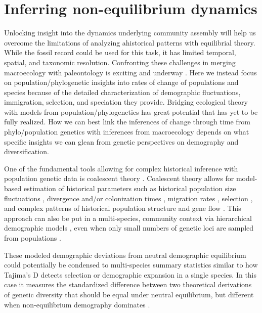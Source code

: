 \documentclass[12pt]{article}
\begin{document}
\section{Inferring non-equilibrium dynamics}

Unlocking insight into the dynamics underlying community assembly will
help us overcome the limitations of analyzing ahistorical patterns
with equilibrial theory. While the fossil record could be used for this task, it has limited temporal, spatial, and taxonomic resolution. Confronting these challenges in merging macroecology with paleontology is exciting and underway \citep{}. Here we instead focus on population/phylogenetic insights into rates of change of populations and species because of the detailed characterization of demographic fluctuations, immigration, selection, and speciation they provide. Bridging ecological theory with models from population/phylogenetics has great potential \citep{Webb2002-yr, Emerson2002-mw, Lavergne2010-ts, Li2016-ns, McGaughran2015-sy, Laroche2015-qo, Vanoverbeke2015-ym, Vellend2005-qd, Papadopoulou2011-bd,Dexter2012-rn} that has yet to be fully realized. How we can best link the inferences of change through time from
% 
% 
phylo/population genetics with inferences from macroecology depends on what specific insights we can glean from genetic perspectives on demography and diversification.

One of the fundamental tools allowing for complex historical inference
with population genetic data is coalescent theory
\citep{Hudson1983-hx, Tajima1983-me, Kingman1982-uf, Kingman1982-ie,
  Rosenberg2002-ag}.  Coalescent theory allows for model-based
estimation of historical parameters such as historical population size
fluctuations \citep{Kuhner1998-dp, Slatkin1991-ec}, divergence and/or
colonization times \citep{Charlesworth2010-hn, Edwards2000-cs},
migration rates \citep{Wakeley2008-se}, selection \citep{Kim2002-ex, Kern2016-ap, Ewing2016-bm}, and complex patterns of
historical population structure \citep{Prado-Martinez2013-hv,
  Bahlo2000-cx} and gene flow \citep{Beerli2001-mt,Hey2004-xe}. This
approach can also be put in a multi-species, community context via hierarchical demographic models \citep{Xue2015-el,
  Hickerson2006-uf, Carstens2016-mc, Chan2014-nq, Satler2016-lb}, even
when only small numbers of genetic loci are sampled from populations
\citep{Drummond2005-zh}.

These modeled demographic deviations from neutral demographic equilibrium could potentially be condensed to multi-species summary statistics similar to how Tajima's D detects selection or demographic expansion in a single species. In this case it measures the standardized difference between two theoretical derivations of genetic diversity that should be equal under neutral equilibrium, but different when non-equilibrium demography dominates \citep{Tajima1989-mc, Freedman2016-yx, Barton1998-xs, Barton2000-gr, Jensen2005-ef, Schrider2016-cw, Stephan2016-lf, Good2014-fq}.
\end{document}
